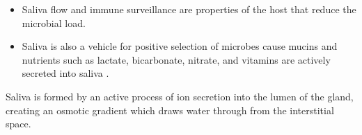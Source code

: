 \begin{itemize}[Host and microbe]
    \item Saliva flow and immune surveillance are properties of the host that reduce the microbial load. 
    \item Saliva is also a vehicle for positive selection of microbes cause mucins and nutrients such as lactate, 
    bicarbonate, nitrate, and vitamins are actively secreted into saliva \cite{Carperter2020}.
\end{itemize}  

\begin{tcolorbox}[
    title=Saliva,
    title filled=false,
    colback=blue!5!white,
    colframe=blue!75!black]
    Saliva is formed by an active process of ion secretion into the lumen of the gland, creating an osmotic gradient which 
    draws water through from the interstitial space. 


\end{tcolorbox}
